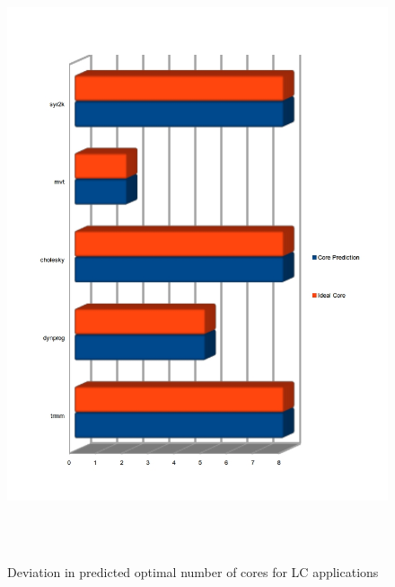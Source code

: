 \documentclass[diploma]{Styles/softlab-thesis}
\begin{document}
\begin{figure}[ht!]
\begin{center}
\includegraphics[width=160mm, height=180mm]{images/core-errors-LC.jpg}
\caption{Deviation in predicted optimal number of cores for LC applications \label{overflow}}
\end{center}
\end{figure}
\end{document}
